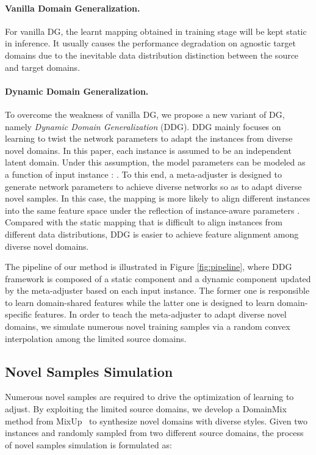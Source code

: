\documentclass{article}
\begin{document}
\paragraph{Vanilla Domain Generalization.}
For vanilla DG, the learnt mapping  obtained in training stage will be kept static in inference. It usually causes the performance degradation on agnostic target domains due to the inevitable data distribution distinction between the source and target domains. 

\paragraph{Dynamic Domain Generalization.}
To overcome the weakness of vanilla DG, we propose a new variant of DG, namely \emph{Dynamic Domain Generalization} (DDG). DDG mainly focuses on learning to twist the network parameters to adapt the instances from diverse novel domains. In this paper, each instance is assumed to be an independent latent domain. Under this assumption, the model parameters  can be modeled as a function of input instance : . To this end, a meta-adjuster is designed to generate network parameters to achieve diverse networks so as to adapt diverse novel samples.
In this case, the mapping  is more likely to align different instances into the same feature space under the reflection of instance-aware parameters . Compared with the static mapping that is difficult to align instances from different data distributions, DDG is easier to achieve feature alignment among diverse novel domains. 

The pipeline of our method is illustrated in Figure \ref{fig:pipeline}, where DDG framework is composed of a static component and a dynamic component updated by the meta-adjuster based on each input instance. The former one is responsible to learn domain-shared features while the latter one is designed to learn domain-specific features. In order to teach the meta-adjuster to adapt diverse novel domains, we simulate numerous novel training samples via a random convex interpolation among the limited source domains. 



\subsection{Novel Samples Simulation}
Numerous novel samples are required to drive the optimization of learning to adjust. By exploiting the limited source domains, we develop a DomainMix method from MixUp~\cite{mixup} to synthesize novel domains with diverse styles. Given two instances  and  randomly sampled from two different source domains, the process of novel samples simulation is formulated as:
\end{document}
